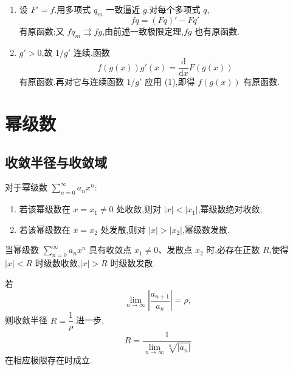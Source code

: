 \begin{solution}
    \begin{enumerate}
        \item 设 $F'=f$.用多项式 $q_m$ 一致逼近 $g$.对每个多项式 $q$,
              \[
                  fq=(Fq)'-Fq'
              \]
              有原函数;又 $fq_m\rightrightarrows fg$,由前述一致极限定理,$fg$ 也有原函数.
        \item $g'>0$,故 $1/g'$ 连续.函数
              \[
                  f(g(x))g'(x)=\dfrac{\mathrm{d}}{\mathrm{d}x}F(g(x))
              \]
              有原函数.再对它与连续函数 $1/g'$ 应用 (1),即得 $f(g(x))$ 有原函数.
    \end{enumerate}
\end{solution}


\newpage

\section{幂级数}


\subsection{收敛半径与收敛域}

\begin{theorem}[\markstar]
    对于幂级数 $\displaystyle\sum\limits_{n=0}^{\infty}a_nx^n$:
    \begin{enumerate}
        \item 若该幂级数在 $x=x_1\neq0$ 处收敛,则对 $|x|<|x_1|$,幂级数绝对收敛;
        \item 若该幂级数在 $x=x_2$ 处发散,则对 $|x|>|x_2|$,幂级数发散.
    \end{enumerate}
\end{theorem}

\begin{corollary}[\markstar]
    当幂级数 $\displaystyle\sum\limits_{n=0}^{\infty}a_nx^n$ 具有收敛点 $x_1\neq0$、发散点 $x_2$ 时,必存在正数 $R$,使得 $|x|<R$ 时级数收敛,$|x|>R$ 时级数发散.
\end{corollary}

\begin{theorem}[\markstar]
    若
    \[
        \lim\limits_{n\to\infty}\left|\dfrac{a_{n+1}}{a_n}\right|=\rho,
    \]
    则收敛半径 $R=\dfrac{1}{\rho}$.进一步,
    \[
        R=\dfrac{1}{\displaystyle\lim\limits_{n\to\infty}\sqrt[n]{|a_n|}}
    \]
    在相应极限存在时成立.
\end{theorem}

